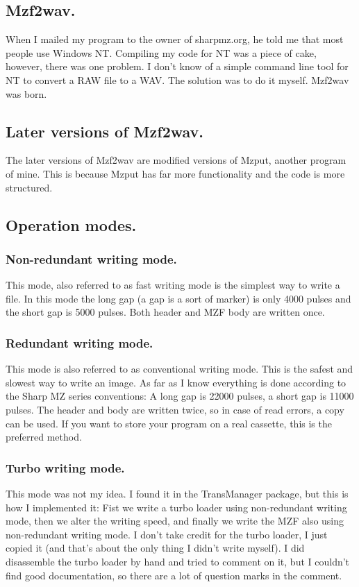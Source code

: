 \documentclass{article}
\begin{document}
\subsection{Mzf2wav.}
When I mailed my program to the owner of sharpmz.org, he told me that most
people use Windows NT. Compiling my code for NT was a piece of cake, however,
there was one problem. I don't know of a simple command line tool for NT to
convert a RAW file to a WAV. The solution was to do it myself. Mzf2wav was
born.

\subsection{Later versions of Mzf2wav.}
The later versions of Mzf2wav are modified versions of Mzput, another program
of mine. This is because Mzput has far more functionality and the code is more 
structured. 

\subsection{Operation modes.}
\subsubsection{Non-redundant writing mode.}
This mode, also referred to as fast writing mode is the simplest way to 
write a file. In this mode the long gap (a gap is a sort of marker) is only
4000 pulses and the short gap is 5000 pulses. Both header and MZF body are
written once.

\subsubsection{Redundant writing mode.}
This mode is also referred to as conventional writing mode. This is the safest
and slowest way to write an image. As far as I know everything is done 
according to the Sharp MZ series conventions: A long gap is 22000 pulses,
a short gap is 11000 pulses. The header and body are written twice, so in
case of read errors, a copy can be used. If you want to store your program on
a real cassette, this is the preferred method.

\subsubsection{Turbo writing mode.}
This mode was not my idea. I found it in the TransManager package, but this is
how I implemented it: Fist we write a turbo loader using non-redundant writing 
mode, then we alter the writing speed, and finally we write the MZF also using 
non-redundant writing mode. I don't take credit for the turbo loader, I just 
copied it (and that's about the only thing I didn't write myself). I did 
disassemble the turbo loader by hand and tried to comment on it, but I couldn't
find good documentation, so there are a lot of question marks in the comment.
\end{document}
